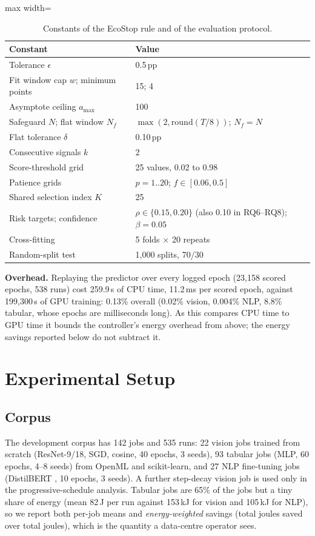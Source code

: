 \documentclass[3p,twocolumn,10pt]{elsarticle}
\theoremstyle{definition}
\begin{document}
\begin{table}[t]
\centering
\caption{Constants of the EcoStop rule and of the evaluation protocol.}
\label{tab:hyper}
\footnotesize
\begin{adjustbox}{max width=\columnwidth}
\begin{tabular}{p{4.3cm}p{3.2cm}}
\toprule
Constant & Value \\
\midrule
Tolerance $\epsilon$ & 0.5\,pp \\
Fit window cap $w$; minimum points & 15; 4 \\
Asymptote ceiling $a_{\max}$ & 100 \\
Safeguard $N$; flat window $N_f$ & $\max(2,\mathrm{round}(T/8))$; $N_f=N$ \\
Flat tolerance $\delta$ & 0.10\,pp \\
Consecutive signals $k$ & 2 \\
Score-threshold grid & 25 values, 0.02 to 0.98 \\
Patience grids & $p=1..20$; $f\in[0.06,0.5]$ \\
Shared selection index $K$ & 25 \\
Risk targets; confidence & $\rho\in\{0.15,0.20\}$ (also 0.10 in RQ6--RQ8); $\beta=0.05$ \\
Cross-fitting & 5 folds $\times$ 20 repeats \\
Random-split test & 1{,}000 splits, 70/30 \\
\bottomrule
\end{tabular}
\end{adjustbox}
\end{table}

\textbf{Overhead.} Replaying the predictor over every logged epoch (23{,}158 scored epochs, 538 runs) cost 259.9\,s of CPU time, 11.2\,ms per scored epoch, against 199{,}300\,s of GPU training: 0.13\% overall (0.02\% vision, 0.004\% NLP, 8.8\% tabular, whose epochs are milliseconds long). As this compares CPU time to GPU time it bounds the controller's energy overhead from above; the energy savings reported below do not subtract it.

\section{Experimental Setup}
\label{sec:setup}

\subsection{Corpus}
\label{sec:corpus}
The development corpus has 142 jobs and 535 runs: 22 vision jobs trained from scratch (ResNet-9/18, SGD, cosine, 40 epochs, 3 seeds), 93 tabular jobs (MLP, 60 epochs, 4--8 seeds) from OpenML \citep{vanschoren2014openml} and scikit-learn, and 27 NLP fine-tuning jobs (DistilBERT \citep{sanh2019distilbert}, 10 epochs, 3 seeds). A further step-decay vision job is used only in the progressive-schedule analysis. Tabular jobs are 65\% of the jobs but a tiny share of energy (mean 82\,J per run against 153\,kJ for vision and 105\,kJ for NLP), so we report both per-job means and \emph{energy-weighted} savings (total joules saved over total joules), which is the quantity a data-centre operator sees.
\end{document}
